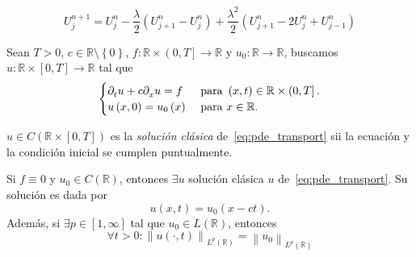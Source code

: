 \begin{equation*}
    U^{n+1}_{j}=
    U^{n}_{j}-
    \dfrac{\lambda}{2}
    \left(U^{n}_{j+1}-U^{n}_{j}\right)+
    \dfrac{\lambda^{2}}{2}
    \left(
    U^{n}_{j+1}-
    2U^{n}_{j}+
    U^{n}_{j-1}
    \right)
\end{equation*}

\begin{example}
    Sean $T>0$, $c\in\mathbb{R}\setminus\left\{0\right\}$,
    $f\colon\mathbb{R}\times\left(0,T\right]\to\mathbb{R}$ y
    $u_{0}\colon\mathbb{R}\to\mathbb{R}$, buscamos
    $u\colon\mathbb{R}\times\left[0,T\right]\to\mathbb{R}$
    tal que
    \begin{equation}
        \begin{cases}
            \difcp{u}{t}+
            c\difcp{u}{x}=f
             & \text{ para }
            \left(x,t\right)\in\mathbb{R}\times\left(0,T\right]. \\
            u\left(x,0\right)=u_{0}\left(x\right)
             & \text{ para }
            x\in\mathbb{R}.
        \end{cases}\label{eq:pde_transport}
    \end{equation}
\end{example}

\begin{definition}
    $u\in C\left(\mathbb{R}\times\left[0,T\right]\right)$ es la
    \emph{solución clásica} de~\eqref{eq:pde_transport} sii la
    ecuación y la condición inicial se cumplen puntualmente.
\end{definition}

\begin{theorem}
    Si $f\equiv0$ y $u_{0}\in C\left(\mathbb{R}\right)$, entonces
    $\exists u$ solución clásica $u$ de~\eqref{eq:pde_transport}.
    Su solución es dada por
    \begin{equation*}
        u\left(x,t\right)=
        u_{0}\left(x-ct\right).
    \end{equation*}
    Además, si $\exists p\in\left[1,\infty\right]$ tal que
    $u_{0}\in L\left(\mathbb{R}\right)$, entonces
    \begin{equation*}
        \forall t>0:
        {
        \left\|
        u\left(\cdot,t\right)
        \right\|
        }_{L^{p}\left(\mathbb{R}\right)}=
            {
                \left\|
                u_{0}
                \right\|
            }_{L^{p}\left(\mathbb{R}\right)}
    \end{equation*}
\end{theorem}

